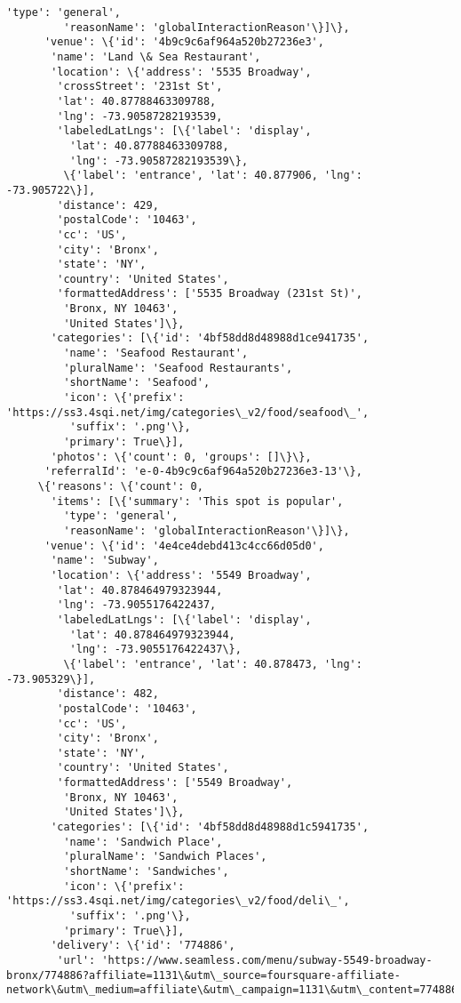 \documentclass[11pt]{article}
\begin{document}
\begin{tcolorbox}[breakable, size=fbox, boxrule=.5pt, pad at break*=1mm, opacityfill=0]
\begin{Verbatim}[commandchars=\\\{\}]
         'type': 'general',
         'reasonName': 'globalInteractionReason'\}]\},
      'venue': \{'id': '4b9c9c6af964a520b27236e3',
       'name': 'Land \& Sea Restaurant',
       'location': \{'address': '5535 Broadway',
        'crossStreet': '231st St',
        'lat': 40.87788463309788,
        'lng': -73.90587282193539,
        'labeledLatLngs': [\{'label': 'display',
          'lat': 40.87788463309788,
          'lng': -73.90587282193539\},
         \{'label': 'entrance', 'lat': 40.877906, 'lng': -73.905722\}],
        'distance': 429,
        'postalCode': '10463',
        'cc': 'US',
        'city': 'Bronx',
        'state': 'NY',
        'country': 'United States',
        'formattedAddress': ['5535 Broadway (231st St)',
         'Bronx, NY 10463',
         'United States']\},
       'categories': [\{'id': '4bf58dd8d48988d1ce941735',
         'name': 'Seafood Restaurant',
         'pluralName': 'Seafood Restaurants',
         'shortName': 'Seafood',
         'icon': \{'prefix':
'https://ss3.4sqi.net/img/categories\_v2/food/seafood\_',
          'suffix': '.png'\},
         'primary': True\}],
       'photos': \{'count': 0, 'groups': []\}\},
      'referralId': 'e-0-4b9c9c6af964a520b27236e3-13'\},
     \{'reasons': \{'count': 0,
       'items': [\{'summary': 'This spot is popular',
         'type': 'general',
         'reasonName': 'globalInteractionReason'\}]\},
      'venue': \{'id': '4e4ce4debd413c4cc66d05d0',
       'name': 'Subway',
       'location': \{'address': '5549 Broadway',
        'lat': 40.878464979323944,
        'lng': -73.9055176422437,
        'labeledLatLngs': [\{'label': 'display',
          'lat': 40.878464979323944,
          'lng': -73.9055176422437\},
         \{'label': 'entrance', 'lat': 40.878473, 'lng': -73.905329\}],
        'distance': 482,
        'postalCode': '10463',
        'cc': 'US',
        'city': 'Bronx',
        'state': 'NY',
        'country': 'United States',
        'formattedAddress': ['5549 Broadway',
         'Bronx, NY 10463',
         'United States']\},
       'categories': [\{'id': '4bf58dd8d48988d1c5941735',
         'name': 'Sandwich Place',
         'pluralName': 'Sandwich Places',
         'shortName': 'Sandwiches',
         'icon': \{'prefix': 'https://ss3.4sqi.net/img/categories\_v2/food/deli\_',
          'suffix': '.png'\},
         'primary': True\}],
       'delivery': \{'id': '774886',
        'url': 'https://www.seamless.com/menu/subway-5549-broadway-
bronx/774886?affiliate=1131\&utm\_source=foursquare-affiliate-
network\&utm\_medium=affiliate\&utm\_campaign=1131\&utm\_content=774886',

\end{Verbatim}
\end{tcolorbox}
\end{document}

